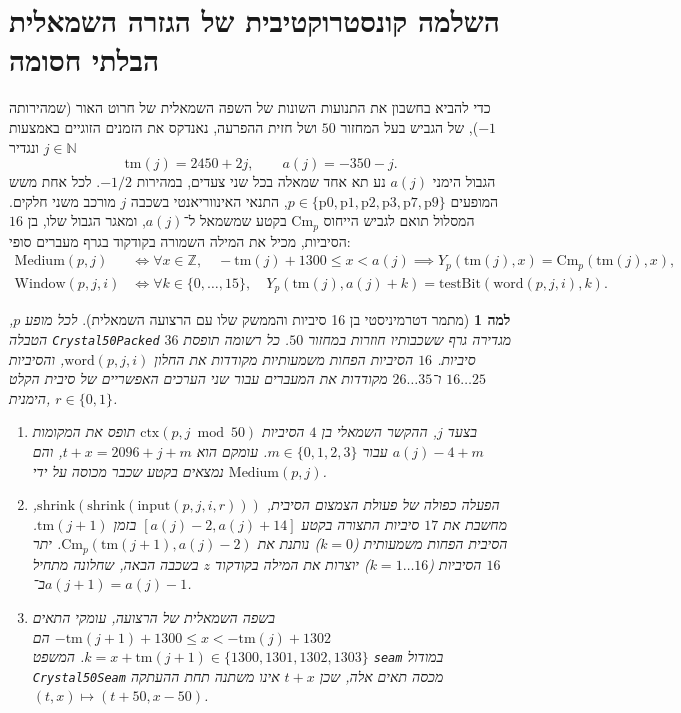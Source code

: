 \documentclass[11pt,a4paper]{article}
\DeclareRobustCommand{\textenglish}[1]{\foreignlanguage{english}{#1}}
\newtheorem{lemma}[theorem]{למה}
\begin{document}
\section{השלמה קונסטרוקטיבית של הגזרה השמאלית הבלתי חסומה}

כדי להביא בחשבון את התנועות השונות של השפה השמאלית של חרוט האור (שמהירותה $-1$), של הגביש בעל המחזור $50$ ושל חזית ההפרעה, נאנדקס את הזמנים הזוגיים באמצעות $j \in \mathbb{N}$ ונגדיר
\begin{equation}
\mathrm{tm}(j) = 2450 + 2j, \qquad a(j) = -350 - j.
\end{equation}
הגבול הימני $a(j)$ נע תא אחד שמאלה בכל שני צעדים, במהירות $-1/2$. לכל אחת משש המופעים $p \in \{\mathrm{p0}, \mathrm{p1}, \mathrm{p2}, \mathrm{p3}, \mathrm{p7}, \mathrm{p9}\}$, התנאי האינווריאנטי בשכבה $j$ מורכב משני חלקים. המסלול תואם לגביש הייחוס $\mathrm{Cm}_p$ בקטע שמשמאל ל־$a(j)$, ומאגר הגבול שלו, בן $16$ הסיביות, מכיל את המילה השמורה בקודקוד בגרף מעברים סופי:
\begin{align}
\mathrm{Medium}(p, j) &\iff \forall x \in \mathbb{Z},\quad -\mathrm{tm}(j) + 1300 \le x < a(j) \implies Y_p(\mathrm{tm}(j), x) = \mathrm{Cm}_p(\mathrm{tm}(j), x), \\
\mathrm{Window}(p, j, i) &\iff \forall k \in \{0, \dots, 15\},\quad Y_p(\mathrm{tm}(j), a(j) + k) = \mathrm{testBit}(\mathrm{word}(p, j, i), k).
\end{align}

\begin{lemma}[מתמר דטרמיניסטי בן 16 סיביות והממשק שלו עם הרצועה השמאלית]\label{lem:transducer}
לכל מופע $p$, הטבלה \textenglish{\texttt{Crystal50Packed}} מגדירה גרף ששכבותיו חוזרות במחזור $50$. כל רשומה תופסת $36$ סיביות. $16$ הסיביות הפחות משמעותיות מקודדות את החלון $\mathrm{word}(p, j, i)$, והסיביות $16\dots 25$ ו־$26\dots 35$ מקודדות את המעברים עבור שני הערכים האפשריים של סיבית הקלט הימנית, $r \in \{0, 1\}$.
\begin{enumerate}[label=(\alph*)]
    \item בצעד $j$, ההקשר השמאלי בן $4$ הסיביות $\mathrm{ctx}(p, j \bmod 50)$ תופס את המקומות $a(j) - 4 + m$ עבור $m \in \{0, 1, 2, 3\}$. עומקם הוא $t + x = 2096 + j + m$, והם נמצאים בקטע שכבר מכוסה על ידי $\mathrm{Medium}(p, j)$.
    \item הפעלה כפולה של פעולת הצמצום הסיבית, $\mathrm{shrink}(\mathrm{shrink}(\mathrm{input}(p, j, i, r)))$, מחשבת את $17$ סיביות התצורה בקטע $[a(j)-2, a(j)+14]$ בזמן $\mathrm{tm}(j+1)$. הסיבית הפחות משמעותית ($k=0$) נותנת את $\mathrm{Cm}_p(\mathrm{tm}(j+1), a(j) - 2)$. יתר $16$ הסיביות ($k=1\dots 16$) יוצרות את המילה בקודקוד $z$ בשכבה הבאה, שחלונה מתחיל ב־$a(j+1) = a(j) - 1$.
    \item בשפה השמאלית של הרצועה, עומקי התאים $-\mathrm{tm}(j+1) + 1300 \le x < -\mathrm{tm}(j) + 1302$ הם $k = x + \mathrm{tm}(j+1) \in \{1300,1301,1302,1303\}$. המשפט \textenglish{\texttt{seam}} במודול \textenglish{\texttt{Crystal50Seam}} מכסה תאים אלה, שכן $t + x$ אינו משתנה תחת ההעתקה $(t, x) \mapsto (t + 50, x - 50)$.
\end{enumerate}
\end{lemma}
\end{document}

